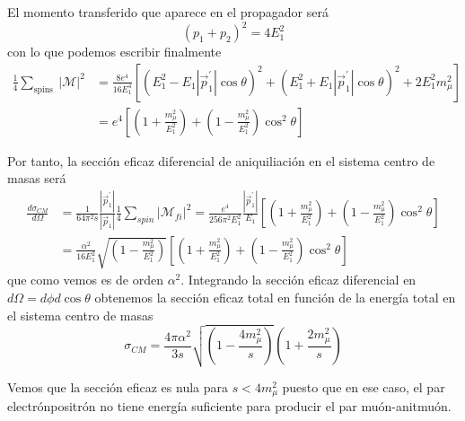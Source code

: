 El momento transferido que aparece en el propagador será
$$
\left(p_{1}+p_{2}\right)^{2}=4 E_{1}^{2}
$$
con lo que podemos escribir finalmente
$$
\begin{align*}
\frac{1}{4} \sum_{\text {spins }}|\mathscr{M}|^{2} & =\frac{8 e^{4}}{16 E_{1}^{4}}\left[\left(E_{1}^{2}-E_{1}\left|\vec{p}_{1}^{\prime}\right| \cos \theta\right)^{2}+\left(E_{1}^{2}+E_{1}\left|\vec{p}_{1}^{\prime}\right| \cos \theta\right)^{2}+2 E_{1}^{2} m_{\mu}^{2}\right] \\
& =e^{4}\left[\left(1+\frac{m_{\mu}^{2}}{E_{1}^{2}}\right)+\left(1-\frac{m_{\mu}^{2}}{E_{1}^{2}}\right) \cos ^{2} \theta\right] \tag{8.26}
\end{align*}
$$

Por tanto, la sección eficaz diferencial de aniquiliación en el sistema centro de masas será
$$
\begin{align*}
\frac{d \sigma_{C M}}{d \Omega} & =\frac{1}{64 \pi^{2} s} \frac{\left|\vec{p}_{1}^{\prime}\right|}{\left|\vec{p}_{1}\right|} \frac{1}{4} \sum_{s p i n}\left|\mathscr{M}_{f i}\right|^{2}=\frac{e^{4}}{256 \pi^{2} E_{1}^{2}} \frac{\left|\vec{p}_{1}^{\prime}\right|}{E_{1}}\left[\left(1+\frac{m_{\mu}^{2}}{E_{1}^{2}}\right)+\left(1-\frac{m_{\mu}^{2}}{E_{1}^{2}}\right) \cos ^{2} \theta\right] \\
& =\frac{\alpha^{2}}{16 E_{1}^{2}} \sqrt{\left(1-\frac{m_{\mu}^{2}}{E_{1}^{2}}\right)}\left[\left(1+\frac{m_{\mu}^{2}}{E_{1}^{2}}\right)+\left(1-\frac{m_{\mu}^{2}}{E_{1}^{2}}\right) \cos ^{2} \theta\right] \tag{8.27}
\end{align*}
$$
que como vemos es de orden $\alpha^{2}$. Integrando la sección eficaz diferencial en $d \Omega=d \phi d \cos \theta$ obtenemos la sección eficaz total en función de la energía total en el sistema centro de masas
\begin{equation*}
\sigma_{C M}=\frac{4 \pi \alpha^{2}}{3 s} \sqrt{\left(1-\frac{4 m_{\mu}^{2}}{s}\right)}\left(1+\frac{2 m_{\mu}^{2}}{s}\right) \tag{8.28}
\end{equation*}

Vemos que la sección eficaz es nula para $s<4 m_{\mu}^{2}$ puesto que en ese caso, el par electrónpositrón no tiene energía suficiente para producir el par muón-anitmuón.

